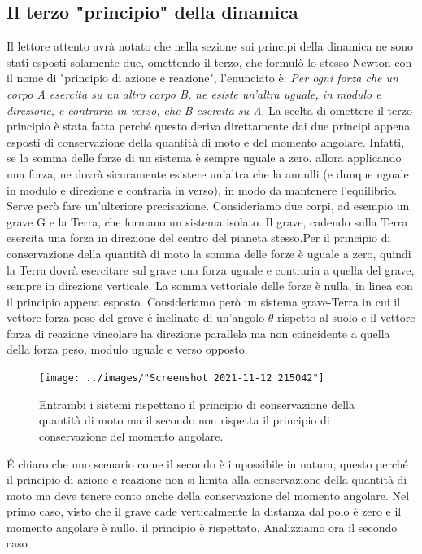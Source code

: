 \subsection{Il terzo "principio" della dinamica}
Il lettore attento avrà notato che nella sezione sui principi della dinamica ne sono stati esposti solamente due, omettendo il terzo, che formulò lo stesso Newton con il nome di "principio di azione e reazione", l'enunciato è: \textit{Per ogni forza che un corpo A esercita su un altro corpo B, ne esiste un'altra uguale, in modulo e direzione, e contraria in verso, che B esercita su A}. La scelta di omettere il terzo principio è stata fatta perché questo deriva direttamente dai due principi appena esposti di conservazione della quantità di moto e del momento angolare. Infatti, se la somma delle forze di un sistema è sempre uguale a zero, allora applicando una forza, ne dovrà sicuramente esistere un'altra che la annulli (e dunque uguale in modulo e direzione e contraria in verso), in modo da mantenere l'equilibrio. Serve però fare un'ulteriore precisazione. Consideriamo due corpi, ad esempio un grave G e la Terra, che formano un sistema isolato. Il grave, cadendo sulla Terra esercita una forza in direzione del centro del pianeta stesso.Per il principio di conservazione della quantità di moto la somma delle forze è uguale a zero, quindi la Terra dovrà esercitare sul grave una forza uguale e contraria a quella del grave, sempre in direzione verticale. La somma vettoriale delle forze è nulla, in linea con il principio appena esposto. Consideriamo però un sistema grave-Terra in cui il vettore forza peso del grave è inclinato di un'angolo $\theta$ rispetto al suolo e il vettore forza di reazione vincolare ha direzione parallela ma non coincidente a quella della forza peso, modulo uguale e verso opposto.
\begin{figure}[h]
	\centering
	\texttt{[image: ../images/"Screenshot 2021-11-12 215042"]}
	\caption{Entrambi i sistemi rispettano il principio di conservazione della quantità di moto ma il secondo non rispetta il principio di conservazione del momento angolare.}
	\label{fig:screenshot-2021-11-12-215042}
\end{figure}\FloatBarrier
\'{E} chiaro che uno scenario come il secondo è impossibile in natura, questo perché il principio di azione e reazione non si limita alla conservazione della quantità di moto ma deve tenere conto anche della conservazione del momento angolare. Nel primo caso, visto che il grave cade verticalmente la distanza dal polo è zero e il momento angolare è nullo, il principio è rispettato. Analizziamo ora il secondo caso
